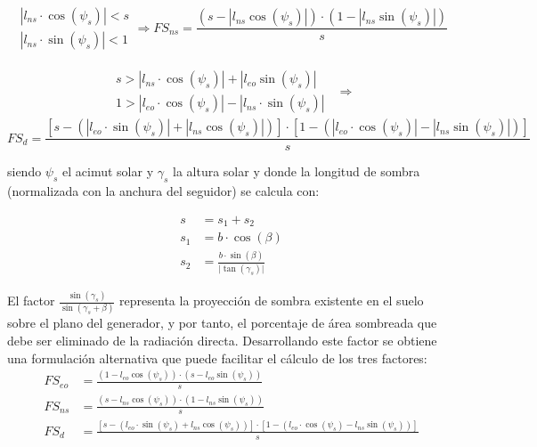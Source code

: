 \begin{equation}
\begin{array}{c}
|l_{ns}\cdot\cos(\psi_{s})|<s\\
|l_{ns}\cdot\sin(\psi_{s})|<1
\end{array}
\Rightarrow 
FS_{ns}=\frac{(s-|l_{ns}\cos(\psi_{s})|)\cdot(1-|l_{ns}\sin(\psi_{s})|)}{s}
\end{equation}


\begin{align*}
\begin{array}{c}
s>|l_{ns}\cdot\cos(\psi_{s})|+|l_{eo}\sin(\psi_{s})|\\
1>|l_{eo}\cdot\cos(\psi_{s})|-|l_{ns}\cdot\sin(\psi_{s})|
\end{array} 
& \Rightarrow
\end{align*}
\begin{equation}
FS_{d}=\frac{\left[s-\left(|l_{eo}\cdot\sin(\psi_{s})|+|l_{ns}\cos(\psi_{s})|\right)\right]\cdot\left[1-\left(|l_{eo}\cdot\cos(\psi_{s})|-|l_{ns}\sin(\psi_{s})|\right)\right]}{s}
\end{equation}


siendo $\psi_{s}$ el acimut solar y $\gamma_{s}$ la altura solar y
donde la longitud de sombra (normalizada con la anchura del seguidor) se calcula con:

\begin{align}
s & =s_{1}+s_{2}\\
s_{1} & =b\cdot\cos(\beta)\\
s_{2} & =\frac{b\cdot\sin(\beta)}{\vert\tan(\gamma_{s})\vert}
\end{align}

El factor $\frac{\sin(\gamma_{s})}{\sin(\gamma_{s}+\beta)}$ representa 
la proyección de sombra existente en el suelo sobre el plano 
del generador, y por tanto, el porcentaje de área sombreada que 
debe ser eliminado de la radiación directa. Desarrollando este factor 
se obtiene una formulación alternativa que puede facilitar el cálculo de los tres factores:
\begin{align}
FS_{eo} & =\frac{(1-l_{eo}\cos(\psi_{s}))\cdot(s-l_{eo}\sin(\psi_{s}))}{s}\\
FS_{ns} & =\frac{(s-l_{ns}\cos(\psi_{s}))\cdot(1-l_{ns}\sin(\psi_{s}))}{s}\\
FS_{d} & =\frac{\left[s-\left(l_{eo}\cdot\sin(\psi_{s})+l_{ns}\cos(\psi_{s})\right)\right]\cdot\left[1-\left(l_{eo}\cdot\cos(\psi_{s})-l_{ns}\sin(\psi_{s})\right)\right]}{s}
\end{align}

